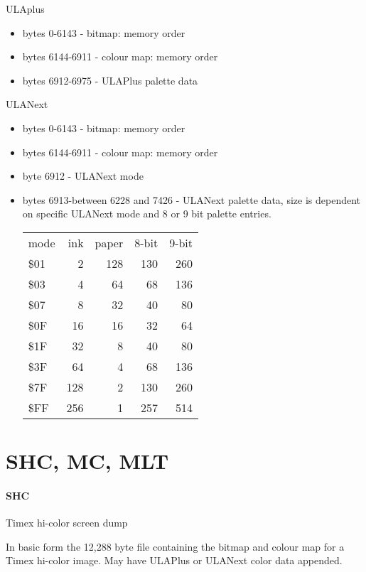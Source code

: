 ULAplus
\begin{itemize}
\item bytes 0-6143 - bitmap: memory order
\item bytes 6144-6911 - colour map: memory order
\item bytes 6912-6975 - ULAPlus palette data
\end{itemize}
ULANext
\begin{itemize}
\item bytes 0-6143 - bitmap: memory order
\item bytes 6144-6911 - colour map: memory order
\item byte 6912 - ULANext mode
\item bytes 6913-between 6228 and 7426 - ULANext palette data, size is
  dependent on specific ULANext mode and 8 or 9 bit palette entries.

  \begin{center}
    \begin{tabular}{l | r | r | r | r}
      mode & ink & paper & 8-bit & 9-bit \\
      \$01 & 2 & 128 & 130 & 260\\
      \$03 & 4 & 64 & 68 & 136\\
      \$07 & 8 & 32 & 40 & 80\\
      \$0F & 16 & 16 & 32 & 64\\
      \$1F & 32 & 8 & 40 & 80\\
      \$3F & 64 & 4 & 68 & 136\\
      \$7F & 128 & 2 & 130 & 260\\
      \$FF & 256 & 1 & 257 & 514
    \end{tabular}
  \end{center}
\end{itemize}
\section{SHC, MC, MLT}
\paragraph{SHC}
Timex hi-color screen dump

In basic form the 12,288 byte file containing the bitmap and colour
map for a Timex hi-color image. May have ULAPlus or ULANext color data
appended.

